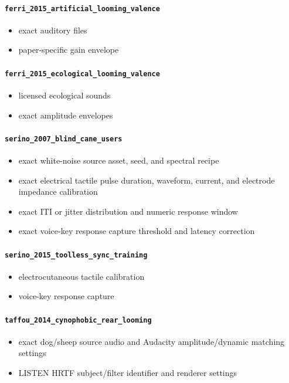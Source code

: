\documentclass[11pt]{article}
\begin{document}
\paragraph{\texttt{ferri\_\allowbreak{}2015\_\allowbreak{}artificial\_\allowbreak{}looming\_\allowbreak{}valence}}
\begin{itemize}
\item exact auditory files
\item paper-specific gain envelope
\end{itemize}
\paragraph{\texttt{ferri\_\allowbreak{}2015\_\allowbreak{}ecological\_\allowbreak{}looming\_\allowbreak{}valence}}
\begin{itemize}
\item licensed ecological sounds
\item exact amplitude envelopes
\end{itemize}
\paragraph{\texttt{serino\_\allowbreak{}2007\_\allowbreak{}blind\_\allowbreak{}cane\_\allowbreak{}users}}
\begin{itemize}
\item exact white-noise source asset, seed, and spectral recipe
\item exact electrical tactile pulse duration, waveform, current, and electrode impedance calibration
\item exact ITI or jitter distribution and numeric response window
\item exact voice-key response capture threshold and latency correction
\end{itemize}
\paragraph{\texttt{serino\_\allowbreak{}2015\_\allowbreak{}toolless\_\allowbreak{}sync\_\allowbreak{}training}}
\begin{itemize}
\item electrocutaneous tactile calibration
\item voice-key response capture
\end{itemize}
\paragraph{\texttt{taffou\_\allowbreak{}2014\_\allowbreak{}cynophobic\_\allowbreak{}rear\_\allowbreak{}looming}}
\begin{itemize}
\item exact dog/sheep source audio and Audacity amplitude/dynamic matching settings
\item LISTEN HRTF subject/filter identifier and renderer settings
\end{itemize}
\end{document}
